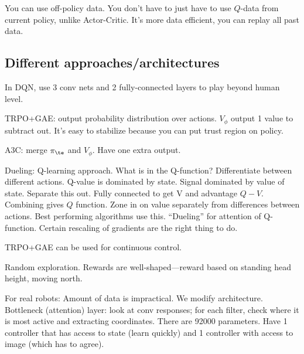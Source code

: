 

You can use off-policy data. You don't have to just have to use $Q$-data from current policy, unlike Actor-Critic. It's more data efficient, you can replay all past data.


\subsection{Different approaches/architectures}

In DQN, use 3 conv nets and 2 fully-connected layers to play beyond human level. 

TRPO+GAE: output probability distribution over actions. $V_\phi$ output 1 value to subtract out. It's easy to stabilize because you can put trust region on policy.

A3C: merge $\pi_\te$ and $V_\phi$. Have one extra output.

Dueling: Q-learning approach. What is in the Q-function? Differentiate between different actions. Q-value is dominated by state. Signal dominated by value of state. Separate this out. Fully connected to get V and advantage $Q-V$. Combining gives $Q$ function. Zone in on value separately from differences between actions. Best performing algorithms use this. ``Dueling'' for attention of Q-function.
Certain rescaling of gradients are the right thing to do.

TRPO+GAE can be used for continuous control.

Random exploration. Rewards are well-shaped---reward based on standing head height, moving north. 

For real robots: Amount of data is impractical. We modify architecture. Bottleneck (attention) layer: look at conv responses; for each filter, check where it is most active and extracting coordinates. There are 92000 parameters. Have 1 controller that has access to state (learn quickly) and 1 controller with access to image (which has to agree).

